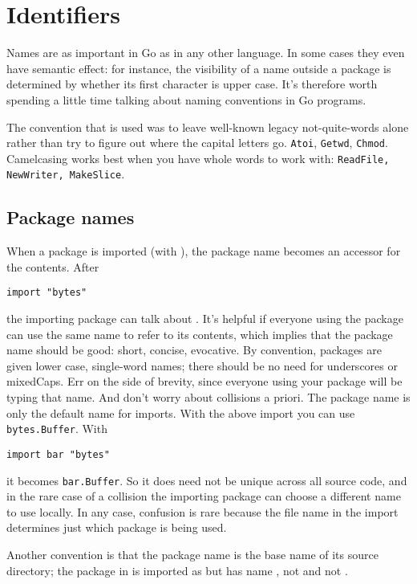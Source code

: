\section{Identifiers}
Names are as important in Go as in any other language. In some cases
they even have semantic effect: for instance, the visibility of a name
outside a package is determined by whether its first character is upper
case. It's therefore worth spending a little time talking about naming
conventions in Go programs.

The convention that is used was to leave well-known legacy
not-quite-words alone rather than try to figure out where
the capital letters go.  \lstinline{Atoi}, \lstinline{Getwd},
\lstinline{Chmod}.
Camelcasing works best when you have whole words
to work with: \lstinline{ReadFile, NewWriter, MakeSlice}.

\subsection{Package names}
When a package is imported (with ), the package name becomes 
an accessor for the contents. After
\begin{lstlisting}
import "bytes"
\end{lstlisting}
the importing package can talk about . It's helpful if
everyone using the package can use the same name to refer to its
contents, which implies that the package name should be good: short,
concise, evocative. By convention, packages are given lower case,
single-word names; there should be no need for underscores or mixedCaps.
Err on the side of brevity, since everyone using your package will be
typing that name. And don't worry about collisions a priori. The package
name is only the default name for imports. With the above import 
you can use \lstinline{bytes.Buffer}. With 
\begin{lstlisting}
import bar "bytes"
\end{lstlisting}
it becomes \lstinline{bar.Buffer}.
So it does need not be unique across
all source code, and in the rare case of a collision the importing
package can choose a different name to use locally. In any case,
confusion is rare because the file name in the import determines just
which package is being used.

Another convention is that the package name is the base name of its
source directory; the package in  is imported as
 but has name , not
 and not
.

